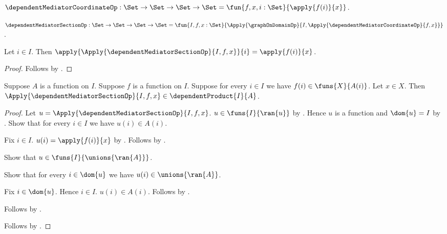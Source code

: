 \begin{definition}\label{dependent_mediator_coordinate_op}
    $\dependentMediatorCoordinateOp:
        \Set\to\Set\to\Set\to\Set
        =\fun{f,x,i:\Set}{\apply{f(i)}{x}}$.
\end{definition}

\begin{definition}\label{dependent_mediator_section_op}
    $\dependentMediatorSectionOp:
        \Set\to\Set\to\Set\to\Set
        =\fun{I,f,x:\Set}{
            \Apply{\graphOnDomainOp}{
                I,\Apply{\dependentMediatorCoordinateOp}{f,x}}}$.
\end{definition}

\begin{proposition}\label{dependent_mediator_section_coordinate}
    Let $i\in I$.
    Then
        $\apply{\Apply{\dependentMediatorSectionOp}{I,f,x}}{i}
            =\apply{f(i)}{x}$.
\end{proposition}
\begin{proof}
    Follows by
        .
\end{proof}

\begin{proposition}\label{dependent_mediator_section_type}
    Suppose $A$ is a function on $I$.
    Suppose $f$ is a function on $I$.
    Suppose for every $i\in I$ we have $f(i)\in\funs{X}{A(i)}$.
    Let $x\in X$.
    Then
        $\Apply{\dependentMediatorSectionOp}{I,f,x}
            \in\dependentProduct{I}{A}$.
\end{proposition}
\begin{proof}
    Let $u=\Apply{\dependentMediatorSectionOp}{I,f,x}$.
    $u\in\funs{I}{\ran{u}}$ by
        .
    Hence $u$ is a function and $\dom{u}=I$ by
        .
    Show that for every $i\in I$ we have $u(i)\in A(i)$.
    \begin{subproof}
        Fix $i\in I$.
        $u(i)=\apply{f(i)}{x}$ by
            .
        Follows by .
    \end{subproof}
    Show that $u\in\funs{I}{\unions{\ran{A}}}$.
    \begin{subproof}
        Show that for every $i\in\dom{u}$ we have
            $u(i)\in\unions{\ran{A}}$.
        \begin{subproof}
            Fix $i\in\dom{u}$.
            Hence $i\in I$.
            $u(i)\in A(i)$.
            Follows by .
        \end{subproof}
        Follows by .
    \end{subproof}
    Follows by .
\end{proof}


